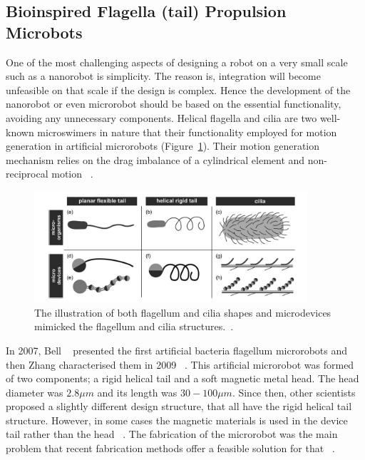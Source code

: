 \documentclass[a4paper,11pt]{article}
\begin{document}
\begin{sloppypar}
\subsection{Bioinspired Flagella (tail) Propulsion Microbots}

One of the most challenging aspects of designing a robot on a very small scale such 
as a nanorobot is simplicity. The reason is, integration will become unfeasible on that
 scale if the design is complex. Hence the development of the nanorobot or even microrobot
 should be based on the essential functionality, avoiding any unnecessary components. Helical 
flagella and cilia are two well-known microswimers in nature that their functionality employed for motion 
generation in artificial microrobots  (Figure~\ref{cilia}). Their motion generation mechanism relies on
 the drag imbalance of a cylindrical element and non-reciprocal motion ~\citep{gao2013bioinspired}. 



\begin{figure}
  \centering
    \includegraphics[width=0.9\textwidth]{cilia}
  \caption{The illustration of both flagellum and cilia shapes and microdevices mimicked the flagellum and cilia 
structures.~\citep{peyer2013bio}.}
  \label{cilia}
\end{figure}

In 2007, Bell ~\citep{gao2013bioinspired} presented the first artificial bacteria flagellum microrobots and then
 Zhang characterised them in 2009 ~\citep{gao2013bioinspired}. This artificial microrobot was formed of two 
components; a rigid helical tail and a soft magnetic metal head. The head diameter 
was $2.8 \mu  m$ and its length was $30-100 \mu m$. Since then, other scientists proposed a slightly different design 
structure, that all have the rigid helical tail structure. However, in some cases the magnetic
 materials is used in the device tail rather than the head ~\citep{gao2013bioinspired}. 
The fabrication of the microrobot was the main problem that recent fabrication methods 
offer a feasible solution for that ~\citep{gao2013bioinspired}. 


\end{sloppypar}
\end{document}
